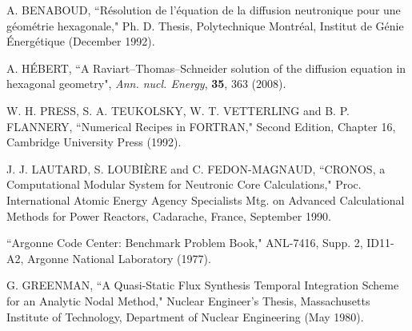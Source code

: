 \begin{thebibliography}{99}
A. BENABOUD, ``R\'esolution de l'\'equation de la diffusion neutronique pour une g\'eom\'etrie hexagonale," Ph. D. Thesis, Polytechnique Montr\'eal, Institut de G\'enie \'Energ\'etique (December 1992).

A. H\'EBERT, ``A Raviart--Thomas--Schneider solution of the diffusion equation in hexagonal geometry", {\sl Ann. nucl. Energy},
{\bf 35}, 363 (2008).

W. H. PRESS, S. A. TEUKOLSKY, W. T. VETTERLING and B. P. FLANNERY, ``Numerical Recipes in FORTRAN," Second Edition, Chapter 16, Cambridge University Press (1992).

J. J. LAUTARD, S. LOUBI\`ERE and C. FEDON-MAGNAUD, ``CRONOS, a Computational Modular System for Neutronic Core Calculations," Proc. International Atomic Energy Agency Specialists Mtg. on Advanced Calculational Methods for Power Reactors, Cadarache, France, September 1990.

``Argonne Code Center: Benchmark Problem Book," ANL-7416, Supp. 2, ID11-A2, Argonne National Laboratory (1977).

G. GREENMAN, ``A Quasi-Static Flux Synthesis Temporal Integration Scheme for an Analytic Nodal Method," Nuclear Engineer's Thesis, Massachusetts Institute of Technology, Department of Nuclear Engineering (May 1980).

\end{thebibliography}

